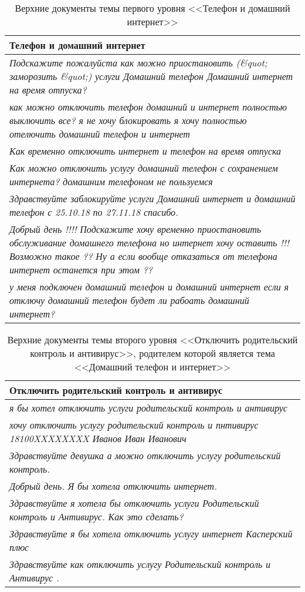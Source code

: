 \begin{table}[!h]
\begin{tabular}{p{7cm}}
  \hline
  \textbf{Телефон и домашний интернет} \\
  \hline
  \textsl{Подскажите пожалуйста как можно приостановить (\&quot; заморозить \&quot;) услуги Домашний телефон Домашний интернет на время отпуска?} \\
  \textsl{как можно отключить телефон домашний и интернет полностью выключить все?
я не хочу блокировать я хочу полностью отелючить домашний телефон и интернет} \\
  \textsl{Как временно отключить интернет и телефон на время отпуска} \\
  \textsl{Как можно отключить услугу домашний телефон с сохранением интернета? домашним телефоном не пользуемся} \\
  \textsl{Здравствуйте заблокируйте услуги Домашний интернет и домашний телефон с 25.10.18 по 27.11.18 спасибо.} \\
  \textsl{Добрый день !!!! Подскажите хочу временно приостановить обслуживание домашнего телефона но интернет хочу оставить !!! Возможно такое ??  Ну а если вообще отказаться от телефона интернет останется при этом ??} \\
  \textsl{у меня подключен домашний телефон и домашний интернет если я отключу домашний телефон будет ли рабоать домашний интернет?} \\
  \hline
\end{tabular}

\caption{Верхние документы темы первого уровня <<Телефон и домашний интернет>>}
\label{topic_documents}
\end{table}

\begin{table}[!h]
\begin{tabular}{p{7cm}}
  \hline
  \textbf{Отключить родительский контроль и антивирус} \\
  \hline
  \textsl{я бы хотел отключить услуги родительский контроль и антивирус} \\
  \textsl{хочу отключить услугу родительский контроль и пнтивирус
18100XXXXXXXX Иванов Иван Иванович} \\
  \textsl{Здравствуйте девушка а можно отключить услугу родительский контроль.} \\
  \textsl{Добрый день. Я бы хотела отключить интернет.} \\
  \textsl{Здравствуйте я хотела бы отключить услуги Родительский контроль и Антивирус. Как это сделать?} \\
  \textsl{Здравствуйте я бы хотела отключить услугу интернет Касперский плюс} \\
  \textsl{Здравствуйте как отключить услугу Родительский контроль и Антивирус .} \\
  \hline
\end{tabular}
\caption{Верхние документы темы второго уровня <<Отключить родительский контроль и антивирус>>, родителем которой является тема <<Домашний телефон и интернет>>}
\label{subtopic_documents}
\end{table}

